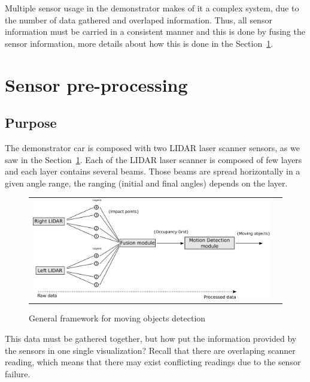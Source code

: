 Multiple sensor usage in the demonstrator makes of it a complex system, due to the number of data gathered and overlaped information. Thus, all sensor information must be carried in a consistent manner and this is done by fusing the sensor information, more details about how this is done in the Section~\ref{sec:sensor:fusion}.

\section{Sensor pre-processing} %
\label{sec:sensor:fusion}


\subsection{Purpose}

The demonstrator car is composed with two LIDAR laser scanner sensors, as we saw in the Section~\ref{sec:sensor:fusion}. Each of the LIDAR laser scanner is composed of few layers and each layer contains several beams. Those beams are spread horizontally in a given angle range, the ranging (initial and final angles) depends on the layer.

\begin{figure}[h]
   \centering
     \begin{tabular}{lr}
       \includegraphics[scale=0.30]{img/fig:motion:framework}
     \end{tabular}
   \caption{General framework for moving objects detection}
   \label{fig:motion:framework}
\end{figure}

This data must be gathered together, but how put the information provided by the sensors in one single visualization? Recall that there are overlaping scanner reading, which means that there may exist conflicting readings due to the sensor failure.

